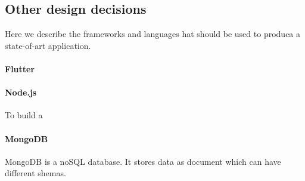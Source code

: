 \subsection{Other design decisions}
Here we describe the frameworks and languages hat should be used to produca a state-of-art application.

\paragraph{Flutter}


\paragraph{Node.js}
To build a

\paragraph{MongoDB}
MongoDB is a noSQL database. It stores data as document which can have different shemas.
